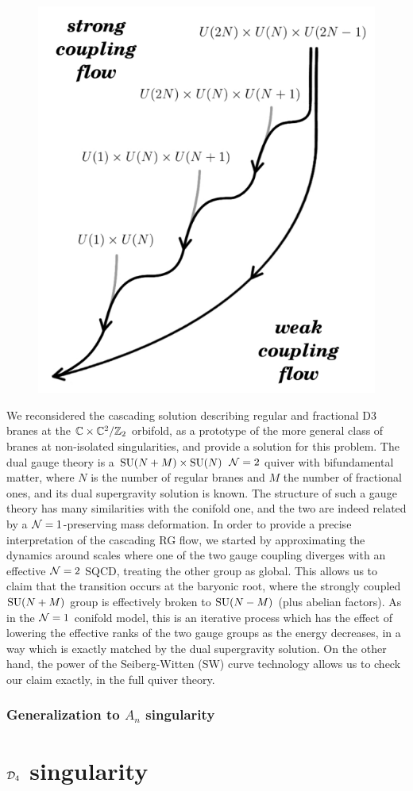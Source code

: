     \begin{figure}[H]
        \centering
        \includegraphics[scale=0.3]{Pictures/cascadeduality.png}
    \end{figure}

    \begin{mybox}
        We reconsidered the cascading solution describing regular and fractional D3 branes at the $\mathbb{C}\times\mathbb{C}^2/\mathbb{Z}_2$ orbifold, as a prototype of the more general class of branes at non-isolated singularities, and provide a solution for this problem. The dual gauge theory is a $\text{SU}(N + M)\times\text{SU}(N)$ $\mathcal{N} = 2$ quiver with bifundamental matter, where $N$ is the number of regular branes and $M$ the number of fractional ones, and its dual supergravity solution is known. The structure of such a gauge theory has many similarities with the conifold one, and the two are indeed related by a $\mathcal{N} = 1$-preserving mass deformation. In order to provide a precise interpretation of the cascading RG flow, we started by approximating the dynamics around scales where one of the two gauge coupling diverges with an effective $\mathcal{N} = 2$ SQCD, treating the other group as global. This allows us to claim that the transition occurs at the baryonic root, where the strongly coupled $\text{SU}(N + M)$ group is effectively broken to $\text{SU}(N - M)$ (plus abelian factors). As in the $\mathcal{N} = 1$ conifold model, this is an iterative process which has the effect of lowering the effective ranks of the two gauge groups as the energy decreases, in a way which is exactly matched by the dual supergravity solution. On the other hand, the power of the Seiberg-Witten (SW) curve technology allows us to check our claim exactly, in the full quiver theory.
    \end{mybox}

\section{Generalization to $A_n$ singularity}

\part{$\mathcal{D}_4$ singularity}